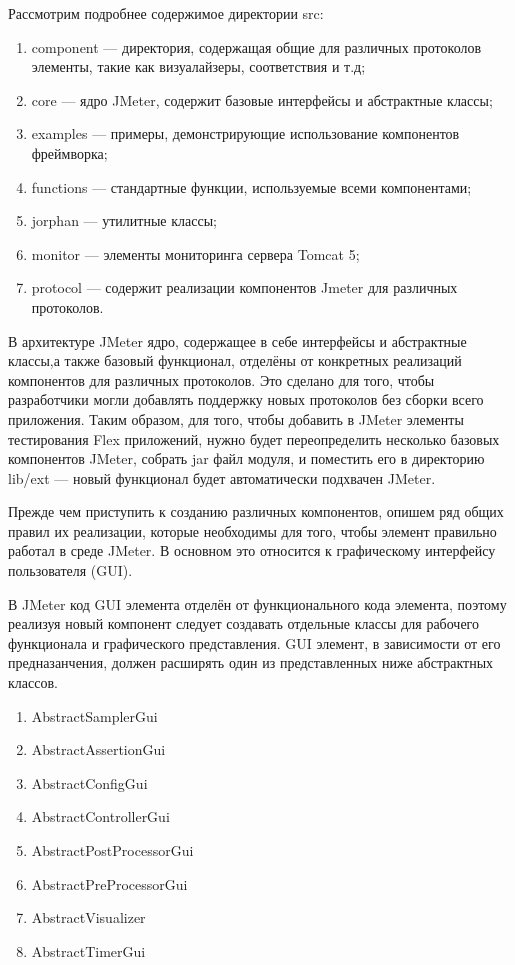 Рассмотрим подробнее содержимое директории src:

\begin{enumerate}
\item component --- директория, содержащая общие для различных протоколов элементы, такие как визуалайзеры,
соответствия и т.д;
\item core --- ядро JMeter, содержит базовые интерфейсы и абстрактные классы;
\item examples --- примеры, демонстрирующие использование компонентов фреймворка;
\item functions --- стандартные функции, используемые всеми компонентами;
\item jorphan --- утилитные классы;
\item monitor --- элементы мониторинга сервера Tomcat 5;
\item protocol --- содержит реализации компонентов Jmeter для различных протоколов.
\end{enumerate}

В архитектуре JMeter ядро, содержащее в себе интерфейсы и абстрактные классы,а также базовый функционал,
отделёны от конкретных реализаций компонентов для различных протоколов. Это сделано для того, чтобы разработчики
могли добавлять поддержку новых протоколов без сборки всего приложения. Таким образом, для того, чтобы добавить
в JMeter элементы тестирования Flex приложений, нужно будет переопределить несколько базовых
компонентов JMeter, собрать jar файл модуля, и поместить его в директорию lib/ext --- новый функционал будет
автоматически подхвачен JMeter.

Прежде чем приступить к созданию различных компонентов, опишем ряд общих правил их реализации,
которые необходимы для того, чтобы элемент правильно работал в среде JMeter. В основном это относится к
графическому интерфейсу пользователя (GUI).

В JMeter код GUI элемента отделён от функционального кода элемента, поэтому реализуя новый компонент следует
создавать отдельные классы для рабочего функционала и графического представления. GUI элемент, в зависимости
 от его предназанчения, должен расширять один из представленных ниже абстрактных классов.

\begin{enumerate}
\item AbstractSamplerGui
\item AbstractAssertionGui
\item AbstractConfigGui
\item AbstractControllerGui
\item AbstractPostProcessorGui
\item AbstractPreProcessorGui
\item AbstractVisualizer
\item AbstractTimerGui
\end{enumerate}

